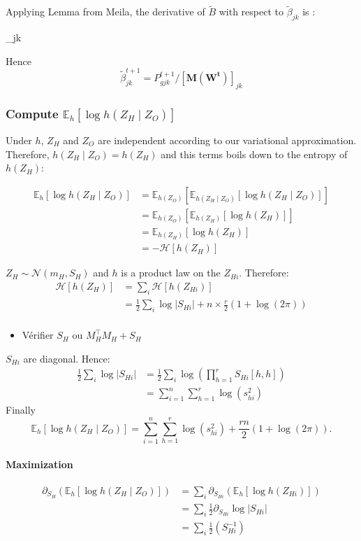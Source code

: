 \documentclass[11pt,a4paper]{article}
\newcommand*\lesswidefbox[1]{\fbox{\hspace{2em}#1\hspace{2em}}}
\newcommand{\Esp}{\mathds{E}}
\newcommand{\entr}{\mathcal{H}}
\begin{document}
Applying Lemma from Meila, the derivative of $\widetilde{B}$ with respect to $\widetilde{\beta}_{jk}$ is :
\begin{empheq}[box=\lesswidefbox]{align*}\partial_{\widetilde{\beta}_{jk}} (\widetilde{B})& = [\bm{M}(\bm{W})]_{jk} \times {} 
\end{empheq}
Hence
$$ \widetilde{\beta}_{jk}^{t+1} = P_{gjk}^{t+1}/[\bm{M}(\bm{W^t})]_{jk}$$
\subsubsection{Compute $\Esp_h[\log h(Z_H\mid Z_O)]$}
Under $h$, $Z_H$ and $Z_O$ are independent according to our variational approximation. Therefore, $h(Z_H\mid Z_O) = h(Z_H)$ and this terms boils down to the entropy of $h(Z_H)$:

\begin{align*}
\Esp_h[\log h(Z_H\mid Z_O)] &= \Esp_{h(Z_O)}\left[\Esp_{h(Z_H\mid Z_O)}[\log h(Z_H\mid Z_O)]\right]\\
&=\Esp_{h(Z_O)}\left[\Esp_{h(Z_H)}[\log h(Z_H)]\right]\\
&=\Esp_{h(Z_H)}[\log h(Z_H)] \\
&=-\entr[h(Z_H)]
\end{align*}


$Z_H \sim \mathcal{N}(m_H,S_H)$ and $h$ is a product law on the $Z_{Hi}$. Therefore: 
\begin{align*}
\entr[h(Z_H)] &= \sum_i \entr[h(Z_{Hi})] \\
&=\frac{1}{2} \sum_i\log |S_{Hi}| +n\times  \frac{r}{2}(1+\log(2\pi))\\
\end{align*}
\begin{itemize}
\item Vérifier $S_H$ ou $M_H^\intercal M_H + S_H$ 
\end{itemize}
$S_{Hi}$ are diagonal. Hence:
\begin{align*}
\frac{1}{2} \sum_i\log |S_{Hi}| &= \frac{1}{2} \sum_i \log \left(\prod_{h=1}^r S_{Hi}[h,h] \right)\\
&= \sum_{i=1}^n \sum_{h=1}^r \log(s_{hi}^2)
\end{align*}
Finally $$ \Esp_h[\log h(Z_H\mid Z_O)] = \sum_{i=1}^n \sum_{h=1}^r \log(s_{hi}^2) + \frac{rn}{2}(1+\log(2\pi)).$$

\paragraph{Maximization}
\begin{align*}
\partial_{S_H} (\Esp_h[\log h(Z_H\mid Z_O)]) &= \sum_i\partial_{S_{Hi}} (\Esp_h[\log h(Z_{Hi})])  \\
&=\sum_i \frac{1}{2} \partial_{S_{Hi}} \log |S_{Hi}|\\
&=\sum_i \frac{1}{2} (S_{Hi}^{-1})
\end{align*}
\end{document}
